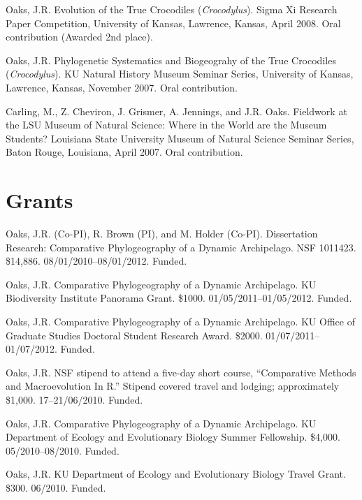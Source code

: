 \documentclass[10pt]{article}
\newcommand{\ignore}[1]{}
\begin{document}
\hangindent=5mm
Oaks, J.R.
Evolution of the True Crocodiles (\emph{Crocodylus}).
Sigma Xi Research Paper Competition, University of Kansas, Lawrence, Kansas, April 2008.
Oral contribution (Awarded 2nd place).

\hangindent=5mm
Oaks, J.R.
Phylogenetic Systematics and Biogeograhy of the True Crocodiles (\emph{Crocodylus}).
KU Natural History Museum Seminar Series, University of Kansas, Lawrence, Kansas, November 2007.
Oral contribution.

\hangindent=5mm
Carling, M., Z. Cheviron, J. Grismer, A. Jennings, and J.R. Oaks.
Fieldwork at the LSU Museum of Natural Science: Where in the World are the Museum Students?
Louisiana State University Museum of Natural Science Seminar Series, Baton Rouge, Louisiana, April 2007.
Oral contribution.

\section*{Grants}
\hangindent=5mm
Oaks, J.R. (Co-PI), R. Brown (PI), and M. Holder (Co-PI).
Dissertation Research: Comparative Phylogeography of a Dynamic Archipelago.
NSF 1011423.
\$14,886.
08/01/2010--08/01/2012.
Funded.

\hangindent=5mm
Oaks, J.R.
Comparative Phylogeography of a Dynamic Archipelago.
KU Biodiversity Institute Panorama Grant.
\$1000.
01/05/2011--01/05/2012.
Funded.

\hangindent=5mm
Oaks, J.R.
Comparative Phylogeography of a Dynamic Archipelago.
KU Office of Graduate Studies Doctoral Student Research Award.
\$2000.
01/07/2011--01/07/2012.
Funded.

\ignore{
\hangindent=5mm
Oaks, J.R.
Comparative Phylogeography of a Dynamic Archipelago.
The Society for the Study of Evolution Rosemary Grant Graduate Research Award.
\$2,085.
01/07/2010--01/07/2011.
Not funded.
}
\hangindent=5mm
Oaks, J.R.
NSF stipend to attend a five-day short course, ``Comparative Methods and Macroevolution In R.''
Stipend covered travel and lodging; approximately \$1,000.
17--21/06/2010.
Funded.

\ignore{
\hangindent=5mm
Oaks, J.R.
Comparative Phylogeography of a Dynamic Archipelago.
KU Graduate Studies Summer Research Fellowship.
\$4,000.
05/2010--08/2010.
Not funded.
}
\hangindent=5mm
Oaks, J.R.
Comparative Phylogeography of a Dynamic Archipelago.
KU Department of Ecology and Evolutionary Biology Summer Fellowship.
\$4,000.
05/2010--08/2010.
Funded.

\hangindent=5mm
Oaks, J.R.
KU Department of Ecology and Evolutionary Biology Travel Grant.
\$300.
06/2010.
Funded.
\end{document}
